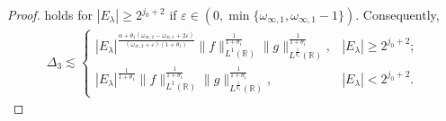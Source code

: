 \documentclass[10pt,a4paper]{amsart}
\begin{document}
\begin{proof}
holds for $|E_\lambda|\geq2^{j_0+2}$ if $\varepsilon\in(0,\min\{\omega_{\infty,1}, \omega_{\infty,1}-1\})$. Consequently,
\begin{align}\label{eq:4.11}
\Delta_{3}\lesssim
\begin{cases}
   |E_\lambda|^{{\frac{\alpha+\theta_1(\omega_{\infty,2}-\omega_{\infty,1}+2\varepsilon)}{(\omega_{\infty,2}+\varepsilon)(1+\theta_{1})}}}
 \|f\|_{L^{1}(\mathbb{R})}^{\frac{1}{1+\theta_{1}}}\|g\|_{L^{\frac{1}{\theta_1}}(\mathbb{R})}^{\frac{1}{1+\theta_{1}}}, & |E_\lambda|\geq2^{j_0+2};\\
  |E_\lambda|^{{\frac{1}{1+\theta_{1}}}}
\|f\|_{L^{1}(\mathbb{R})}^{\frac{1}{1+\theta_{1}}}\|g\|_{L^{\frac{1}{\theta_1}}(\mathbb{R})}^{\frac{1}{1+\theta_{1}}}, &|E_{\lambda}|<2^{j_0+2}.
\end{cases}
\end{align}


\end{proof}
\end{document}
